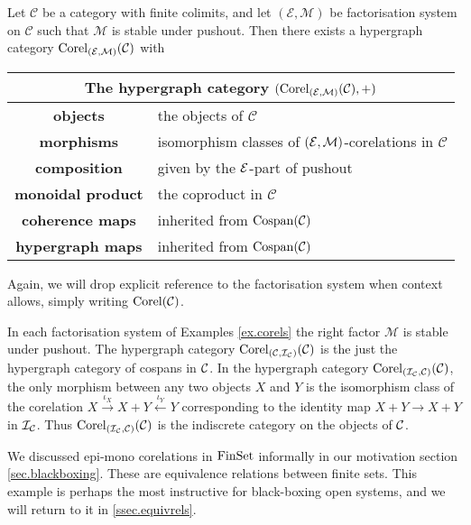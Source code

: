 \begin{theorem} \label{thm.cospantocorel}
  Let $\mathcal C$ be a category with finite colimits, and let $(\mathcal E,
  \mathcal M)$ be factorisation system on $\mathcal C$ such that $\mathcal M$ is
  stable under pushout. Then there exists a hypergraph category
  $\mathrm{Corel}_{(\mathcal E,\mathcal M)}(\mathcal C)$ with 
  \smallskip

  \begin{center}
    \begin{tabular}{| c | p{} |}
      \hline
      \multicolumn{2}{|c|}{The hypergraph category $(\mathrm{Corel}_{(\mathcal E,\mathcal M)}(\mathcal C),+)$} \\
      \hline
      \textbf{objects} & the objects of $\mathcal C$ \\ 
      \textbf{morphisms} & isomorphism classes of $(\mathcal E,\mathcal M)$-corelations in $\mathcal C$\\ 
      \textbf{composition} & given by the $\mathcal E$-part of pushout \\
      \textbf{monoidal product} & the coproduct in $\mathcal C$ \\
      \textbf{coherence maps} & inherited from $\operatorname{{Cospan}}(\mathcal C)$  \\
      \textbf{hypergraph maps} & inherited from $\operatorname{{Cospan}}(\mathcal C)$ \\
      \hline
    \end{tabular}
  \end{center}  
  \smallskip
\end{theorem}

Again, we will drop explicit reference to the factorisation system when context allows, simply writing $\mathrm{Corel}(\mathcal C)$.

\begin{examples} \label{ex.corelcats}
In each factorisation system of Examples \ref{ex.corels} the right factor
$\mathcal M$ is stable under pushout. The hypergraph category 
$\operatorname{{Corel}}_{(\mathcal C,\mathcal I_{\mathcal C})}(\mathcal C)$ is the just the hypergraph category of
cospans in $\mathcal C$. In the hypergraph category $\operatorname{{Corel}}_{(\mathcal I_{\mathcal C},\mathcal
C)}(\mathcal C)$, the only morphism between any two objects $X$ and $Y$ is the
isomorphism class of the corelation $X \xrightarrow{\iota_X} X+Y
\xleftarrow{\iota_Y} Y$ corresponding to the identity map $X+Y \to X+Y$ in $\mathcal
I_{\mathcal C}$. Thus $\operatorname{{Corel}}_{(\mathcal I_{\mathcal C},\mathcal C)}(\mathcal C)$ is the indiscrete
category on the objects of $\mathcal C$. 

We discussed epi-mono corelations in $\mathrm{FinSet}$ informally in our motivation
section \textsection\ref{sec.blackboxing}. These are equivalence relations
between finite sets. This example is perhaps the most instructive for
black-boxing open systems, and we will return to it in
\textsection\ref{ssec.equivrels}.
\end{examples}

